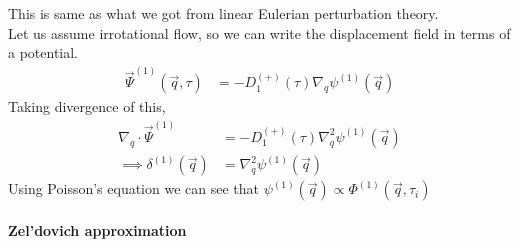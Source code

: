\documentclass[12pt]{article}
\begin{document}
This is same as what we got from linear Eulerian perturbation theory. \\
Let us assume irrotational flow, so we can write the displacement field in terms of a potential.
\begin{align}
\vec{\Psi}^{(1)} (\vec{q}, \tau) &= - D_1^{(+)}(\tau) \nabla_{q} \psi^{(1)} (\vec{q})
\end{align}
Taking divergence of this, 
\begin{align}
\nabla_{q} \cdot \vec{\Psi}^{(1)} &= - D_1^{(+)}(\tau) \nabla_{q}^2 \psi^{(1)} (\vec{q})\\
\implies \delta^{(1)} (\vec{q}) &= \nabla_{q}^2 \psi^{(1)} (\vec{q})
\end{align}
Using Poisson's equation we can see that $\psi^{(1)} (\vec{q}) \propto \Phi^{(1)} (\vec{q},\tau_i)$

\paragraph{Zel'dovich approximation}
~\hfill
\end{document}
